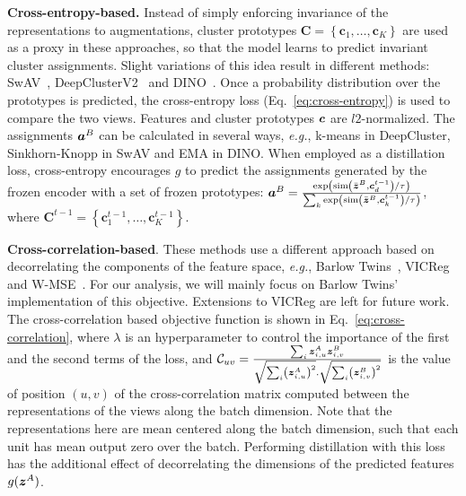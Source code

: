 \noindent\textbf{Cross-entropy-based.} Instead of simply enforcing invariance of the representations to augmentations, cluster prototypes $\mathbf{C} = \left\{\mathbf{c}_{1}, \ldots, \mathbf{c}_{K}\right\}$ are used as a proxy in these approaches, so that the model learns to predict invariant cluster assignments. Slight variations of this idea result in different methods: SwAV~\cite{caron2020unsupervised}, DeepClusterV2~\cite{caron2020unsupervised} and DINO~\cite{caron2021emerging}. Once a probability distribution over the prototypes is predicted, the cross-entropy loss (Eq.~\ref{eq:cross-entropy}) is used to compare the two views.
Features and cluster prototypes $\boldsymbol{c}$ are $l2$-normalized. The assignments $\boldsymbol{a}^B$ can be calculated in several ways, \textit{e.g.}, k-means in DeepCluster, Sinkhorn-Knopp in SwAV and EMA in DINO. When employed as a distillation loss, cross-entropy encourages $g$ to predict the assignments generated by the frozen encoder with a set of frozen prototypes: $\boldsymbol{a}^B = \frac{\exp \left(\operatorname{sim}\left( \bar{\boldsymbol{z}}^B, \boldsymbol{c}^{t-1}_{d}\right) / \tau\right)}{\sum_k \exp \left(\operatorname{sim}\left(\bar{\boldsymbol{z}}^B, \boldsymbol{c}^{t-1}_k\right) / \tau\right)}$, where $\mathbf{C}^{t-1} = \left\{\mathbf{c}^{t-1}_{1}, \ldots, \mathbf{c}^{t-1}_{K}\right\}$.

\noindent\textbf{Cross-correlation-based}. These methods use a different approach based on decorrelating the components of the feature space, \textit{e.g.}, Barlow Twins~\cite{zbontar2021barlow}, VICReg~\cite{bardes2021vicreg} and W-MSE~\cite{ermolov2021whitening}. For our analysis, we will mainly focus on Barlow Twins' implementation of this objective. Extensions to VICReg are left for future work. The cross-correlation based objective function is shown in Eq.~\ref{eq:cross-correlation}, 
where $\lambda$ is an hyperparameter to control the importance of the first and the second terms of the loss, and $\mathcal{C}_{u v} = \frac{\sum_{i} \boldsymbol{z}_{i, u}^{A} \boldsymbol{z}_{i, v}^{B}}{\sqrt{\sum_{i}\left(\boldsymbol{z}_{i, u}^{A}\right)^{2}}. \sqrt{\sum_{i}\left(\boldsymbol{z}_{i, v}^{B}\right)^{2}}}$ is the value of position $(u,v)$ of the cross-correlation matrix computed between the representations of the views along the batch dimension. Note that the representations here are mean centered along the batch dimension, such that each unit has mean output zero over the batch. Performing distillation with this loss has the additional effect of decorrelating the dimensions of the predicted features $g(\boldsymbol{z}^A)$.